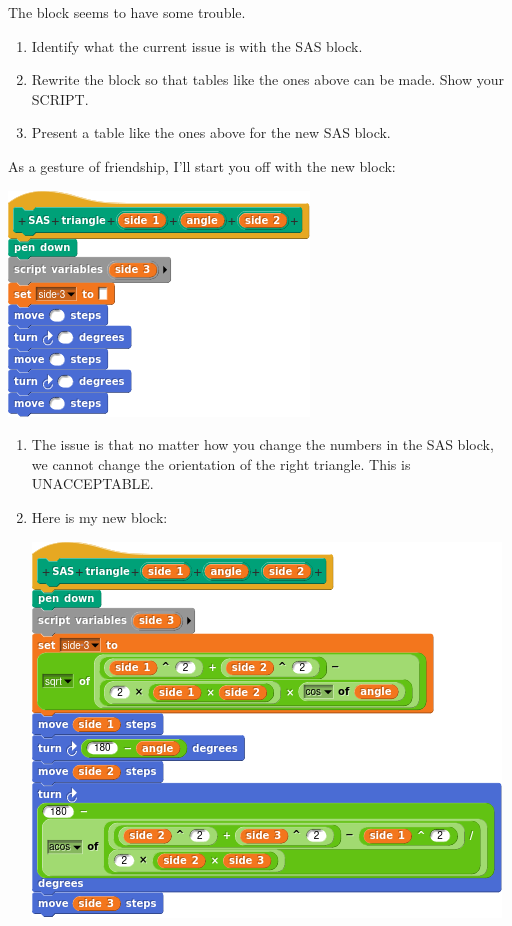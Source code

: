 \documentclass[noauthor,nooutcomes,12pt,hints,handout]{ximera}
\begin{document}
\begin{question}%
  The block  seems to have some trouble.
  \begin{enumerate}
  \item Identify what the current issue is with the SAS block.
  \item Rewrite the block
     so that
    tables like the ones above can be made. Show your SCRIPT.
  \item Present a table like the ones above for the new SAS block.
  \end{enumerate}
  As a gesture of friendship, I'll start you off with the new block:
  \begin{center}
    \includegraphics{newSASBLANK.png}
  \end{center}
  \begin{freeResponse}
    \begin{enumerate}
    \item The issue is that no matter how you change the numbers in
      the SAS block, we cannot change the orientation of the right
      triangle. This is UNACCEPTABLE.
    \item Here is my new block:
      \begin{center}
        \includegraphics[width=.8\textwidth]{newSASblock.png}

\end{center}
\end{enumerate}
\end{freeResponse}
\end{question}
\end{document}
